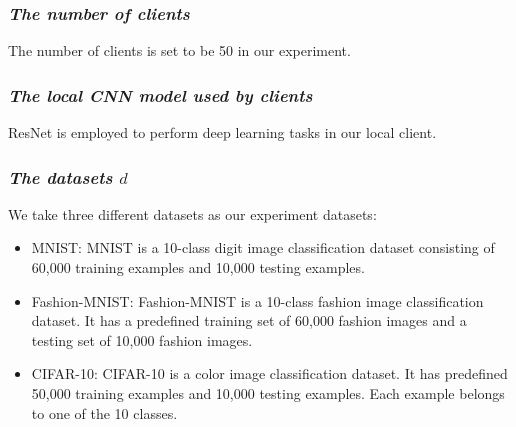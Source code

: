 \documentclass[journal]{IEEEtran}
\begin{document}
  \subsubsection{{\textit{The number of clients}}} The number of clients is set to be 50 in our experiment.
  \subsubsection{{\textit{The local CNN model used by clients}}} ResNet is employed to perform deep learning tasks in our local client.
  \subsubsection{{\textit{The datasets {$d$}}}} We take three different datasets as our experiment datasets: \begin{itemize}
      \item MNIST: MNIST is a 10-class digit image classification dataset consisting of 60,000 training examples and 10,000 testing examples.
      \item Fashion-MNIST: Fashion-MNIST is a 10-class fashion image classification dataset. It has a predefined training set of 60,000 fashion images and a testing set of 10,000 fashion images.
      \item CIFAR-10: CIFAR-10 is a color image classification dataset. It has predefined 50,000 training examples and 10,000 testing examples. Each example belongs to one of the 10 classes.
  \end{itemize} 
\end{document}

